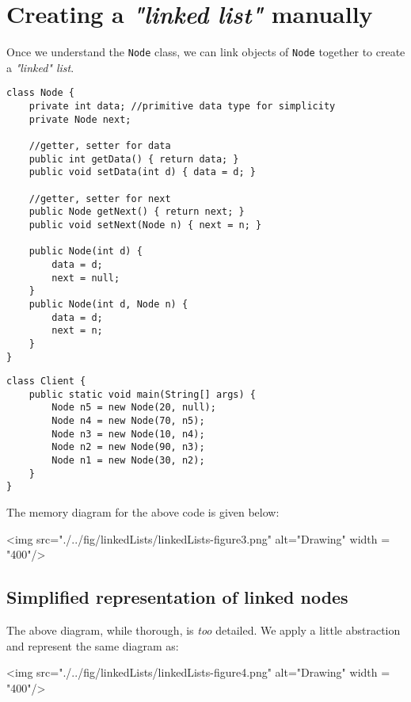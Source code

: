 \section{Creating a \emph{"linked list"} manually}

Once we understand the \texttt{Node} class, we can link objects of \texttt{Node} together to create a \textit{"linked" list}.

\begin{lstlisting}
class Node {
	private int data; //primitive data type for simplicity
	private Node next;
	
	//getter, setter for data
	public int getData() { return data; }	
	public void setData(int d) { data = d; }
	
	//getter, setter for next
	public Node getNext() {	return next; }
	public void setNext(Node n) { next = n; }
	
	public Node(int d) { 
		data = d; 
		next = null; 
	}
	public Node(int d, Node n) { 
		data = d; 
		next = n; 
	}
}
\end{lstlisting}

\newpage

\begin{lstlisting}
class Client {
	public static void main(String[] args) {
		Node n5 = new Node(20, null);
		Node n4 = new Node(70, n5);
		Node n3 = new Node(10, n4);
		Node n2 = new Node(90, n3);
		Node n1 = new Node(30, n2);
	}
}
\end{lstlisting}

The memory diagram for the above code is given below:

\vskip 0.5cm

\begin{center}
<img src="./../fig/linkedLists/linkedLists-figure3.png" alt="Drawing" width = "400"/>
\end{center}

\subsection{Simplified representation of linked nodes}

The above diagram, while thorough, is \emph{too} detailed. We apply a little abstraction and represent the same diagram as:

\begin{center}
<img src="./../fig/linkedLists/linkedLists-figure4.png" alt="Drawing" width = "400"/>
\end{center}

\newpage

